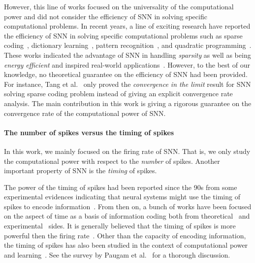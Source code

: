\documentclass[11pt]{article}
\theoremstyle{remark}
\theoremstyle{definition}
\begin{document}
However, this line of works focused on the universality of the computational power and did not consider the efficiency of SNN in solving specific computational problems. 
In recent years, a line of exciting research have reported the efficiency of SNN in solving specific computational problems such as sparse coding~\cite{zylberberg2011sparse,tang2016convergence,tang2017sparse}, dictionary learning~\cite{lin2018dictionary}, pattern recognition~\cite{diehl2015unsupervised,kheradpisheh2016bio,bengio2017stdp}, and quadratic programming~\cite{barrett2013firing}. These works indicated the advantage of SNN in handling \textit{sparsity} as well as being \textit{energy efficient} and inspired real-world applications~\cite{beck2009fast}. However, to the best of our knowledge, no theoretical guarantee on the efficiency of SNN had been provided. 
For instance, Tang et al.~\cite{tang2016convergence,tang2017sparse} only proved the \textit{convergence in the limit} result for SNN solving sparse coding problem instead of giving an explicit convergence rate analysis.
The main contribution in this work is giving a rigorous guarantee on the convergence rate of the computational power of SNN.

\paragraph{The number of spikes versus the timing of spikes}
In this work, we mainly focused on the firing rate of SNN. That is, we only study the computational power with respect to the \textit{number} of spikes. Another important property of SNN is the \textit{timing} of spikes. 

The power of the timing of spikes had been reported since the 90s from some experimental evidences indicating that  neural systems might use the timing of spikes to encode information~\cite{abeles1991corticonics,hopfield1995pattern,rieke1999spikes}. From then on, a bunch of works have been focused on the aspect of time as a basis of information coding both from theoretical~\cite{olshausen1996emergence,maass1997networks,maass2001pulsed,thorpe2001spike} and experimental~\cite{heiligenberg1991neural,bialek1991reading,kuwabara1993delay} sides. It is generally believed that the timing of spikes is more powerful then the firing rate~\cite{thorpe1996speed,rullen2001rate,paugam2012computing}. Other than the capacity of encoding information, the timing of spikes has also been studied in the context of computational power~\cite{thorpe1996speed,maass1997fast,maass1997networks,gollisch2008rapid} and learning~\cite{booij2005gradient,banerjee2016learning,shrestha2017robust}. See the survey by Paugam et al.~\cite{paugam2012computing} for a thorough discussion.
\end{document}
